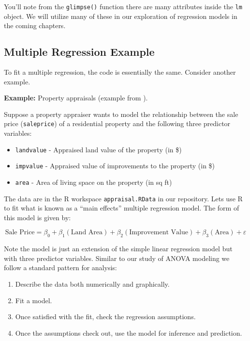 \documentclass[
]{book}
\providecommand{\tightlist}{%
  \setlength{\itemsep}{0pt}\setlength{\parskip}{0pt}}
\begin{document}
You'll note from the \texttt{glimpse()} function there are many attributes inside the \texttt{lm} object.
We will utilize many of these in our exploration of regression models in the coming chapters.

\hypertarget{multiple-regression-example}{%
\subsection{Multiple Regression Example}\label{multiple-regression-example}}

To fit a multiple regression, the code is essentially the same. Consider another example.

\textbf{Example:} Property appraisals (example from \citet{McClaveSincich2008}).

Suppose a property appraiser wants to model the relationship between the sale price (\texttt{saleprice}) of a residential property and the following three predictor variables:

\begin{itemize}
\tightlist
\item
  \texttt{landvalue} - Appraised land value of the property (in \$)
\item
  \texttt{impvalue} - Appraised value of improvements to the property (in \$)
\item
  \texttt{area} - Area of living space on the property (in sq ft)
\end{itemize}

The data are in the R workspace \texttt{appraisal.RData} in our repository. Lets use R to fit what is known as a ``main effects'' multiple regression model. The form of this model is given by:

\[\textrm{Sale Price} = \beta_0 + \beta_1(\textrm{Land Area}) + \beta_2(\textrm{Improvement Value}) + \beta_3(\textrm{Area}) + \varepsilon\]

Note the model is just an extension of the simple linear regression model but with three predictor variables.
Similar to our study of ANOVA modeling we follow a standard pattern for analysis:

\begin{enumerate}
\def\labelenumi{\arabic{enumi}.}
\tightlist
\item
  Describe the data both numerically and graphically.
\item
  Fit a model.
\item
  Once satisfied with the fit, check the regression assumptions.
\item
  Once the assumptions check out, use the model for inference and prediction.
\end{enumerate}
\end{document}
